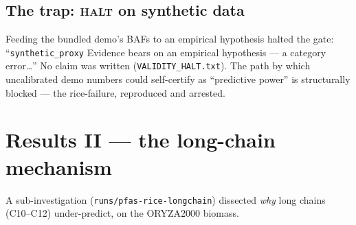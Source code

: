 \documentclass[11pt]{article}
\begin{document}
\subsection{The trap: \textsc{halt} on synthetic data}

Feeding the bundled demo's BAFs to an empirical hypothesis halted the
gate: ``\texttt{synthetic\_proxy} Evidence bears on an empirical
hypothesis --- a category error\ldots'' No claim was written
(\texttt{VALIDITY\_HALT.txt}). The path by which uncalibrated demo
numbers could self-certify as ``predictive power'' is structurally
blocked --- the rice-failure, reproduced and arrested.

\section{Results II --- the long-chain mechanism}
\label{sec:longchain}

A sub-investigation (\texttt{runs/pfas-rice-longchain}) dissected
\emph{why} long chains (C10--C12) under-predict, on the ORYZA2000
biomass.
\end{document}
